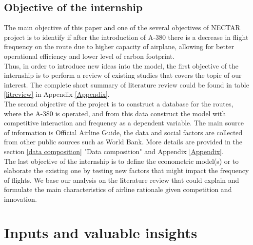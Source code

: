 \documentclass[titlepage, 11pt]{article}
\begin{document}
\subsection{Objective of the internship} \label{Objective Internship}
\tab The main objective of this paper and one of the several objectives of NECTAR project is to identify if after the introduction of A-380 there is a decrease in flight frequency on the route due to higher capacity of airplane, allowing for better operational efficiency and lower level of carbon footprint. \\
\tab Thus, in order to introduce new ideas into the model, the first objective of the internship is to perform a review of existing studies that covers the topic of our interest. The complete short summary of literature review could be found in table \ref{litreview} in Appendix \ref{Appendix}. \\
\tab The second objective of the project is to construct a database for the routes, where the A-380 is operated, and from this data construct the model with competitive interaction and frequency as a dependent variable. The main source of information is Official Airline Guide\cite{OAG}, the data and social factors are collected from other public sources such as World Bank. More details are provided in the section \ref{data composition} "Data composition" and Appendix \ref{Appendix}. \\
\tab The last objective of the internship is to define the econometric model(s) or to elaborate the existing one by testing new factors that might impact the frequency of flights. We base our analysis on the literature review that could explain and formulate the main characteristics of airline rationale given competition and innovation. 


\section{Inputs and valuable insights}\label{inputs}
\end{document}
